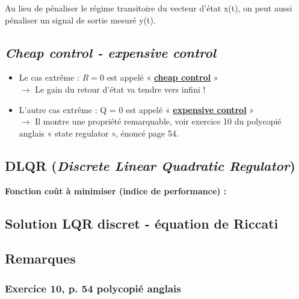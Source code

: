 \documentclass[document.tex]{subfiles}
\begin{document}
Au lieu de pénaliser le régime transitoire du vecteur d'état x(t), on peut aussi pénaliser un signal de sortie mesuré y(t).



\subsection{\textit{Cheap control - expensive control}}

\begin{itemize}[$\bullet$]
\item Le cas extrême : $R = 0$ est appelé « \textbf{\underline{cheap control}} » \\
$\rightarrow$ Le gain du retour d'état va tendre vers infini !

\item L'autre cas extrême : Q = 0 est appelé « \textbf{\underline{expensive control}} » \\
$\rightarrow$ Il montre une propriété remarquable, voir exercice 10 du polycopié anglais « state regulator », énoncé page 54.
\end{itemize}


\subsection{DLQR (\textit{Discrete Linear Quadratic Regulator})}


\textbf{Fonction coût à minimiser (indice de performance) : }


\subsection{Solution LQR discret - équation de Riccati}


\subsection{Remarques}


\subsubsection{Exercice 10, p. 54 polycopié anglais}


\end{document}
